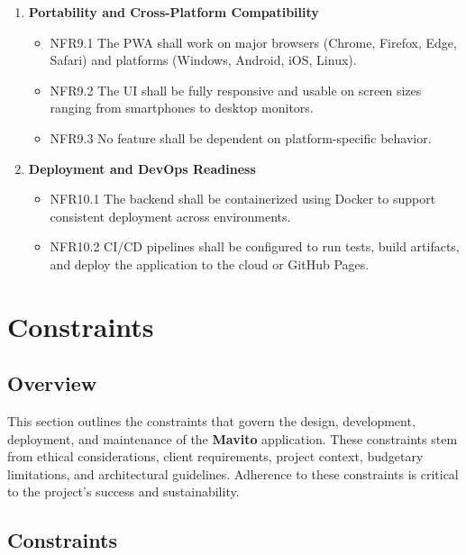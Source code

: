 \documentclass[12pt]{article}
\begin{document}
\begin{enumerate}[label=NFR\arabic*:, leftmargin=2.5em]
    \item \textbf{Portability and Cross-Platform Compatibility}
    \begin{itemize}
        \item NFR9.1 The PWA shall work on major browsers (Chrome, Firefox, Edge, Safari) and platforms (Windows, Android, iOS, Linux).
        \item NFR9.2 The UI shall be fully responsive and usable on screen sizes ranging from smartphones to desktop monitors.
        \item NFR9.3 No feature shall be dependent on platform-specific behavior.
    \end{itemize}
    
    \item \textbf{Deployment and DevOps Readiness}
    \begin{itemize}
        \item NFR10.1 The backend shall be containerized using Docker to support consistent deployment across environments.
        \item NFR10.2 CI/CD pipelines shall be configured to run tests, build artifacts, and deploy the application to the cloud or GitHub Pages.
    \end{itemize}
\end{enumerate}


\section{Constraints}

\subsection{Overview}
This section outlines the constraints that govern the design, development, deployment, and maintenance of the \textbf{Mavito} application. These constraints stem from ethical considerations, client requirements, project context, budgetary limitations, and architectural guidelines. Adherence to these constraints is critical to the project's success and sustainability.

\subsection{Constraints}
\end{document}
